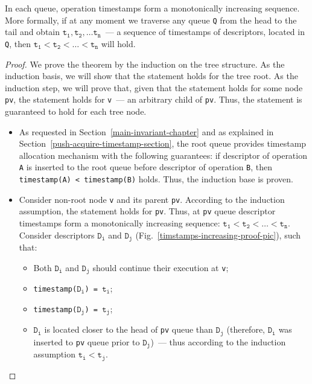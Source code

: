 \documentclass[times, dvipsnames,%
               languages={russian,english} %
              ]{itmo-student-thesis}
\begin{document}
\begin{theorem}
In each queue, operation timestamps form a monotonically increasing sequence. More formally, if at any moment we traverse any queue \texttt{Q} from the head to the tail and obtain $\texttt{t}_{\texttt{1}}, \texttt{t}_{\texttt{2}}, \ldots \texttt{t}_{\texttt{n}}$~--- a sequence of timestamps of descriptors, located in \texttt{Q}, then $\texttt{t}_{\texttt{1}} < \texttt{t}_{\texttt{2}} < \ldots < \texttt{t}_{\texttt{n}}$ will hold.
\end{theorem}

\begin{proof}
We prove the theorem by the induction on the tree structure. As the induction basis, we will show that the statement holds for the tree root. As the induction step, we will prove that, given that the statement holds for some node \texttt{pv}, the statement holds for \texttt{v}~--- an arbitrary child of \texttt{pv}. Thus, the statement is guaranteed to hold for each tree node.

\begin{itemize}
    \item As requested in Section~\ref{main-invariant-chapter} and as explained in Section~\ref{push-acquire-timestamp-section}, the root queue provides timestamp allocation mechanism with the following guarantees: if descriptor of operation \texttt{A} is inserted to the root queue before descriptor of operation \texttt{B}, then \texttt{timestamp(A) < timestamp(B)} holds. Thus, the induction base is proven.
    
    \item Consider non-root node \texttt{v} and its parent \texttt{pv}. According to the induction assumption, the statement holds for \texttt{pv}. Thus, at \texttt{pv} queue descriptor timestamps form a monotonically increasing sequence: $\texttt{t}_{\texttt{1}} < \texttt{t}_{\texttt{2}} < \ldots < \texttt{t}_{\texttt{n}}$. Consider descriptors $\texttt{D}_{\texttt{i}}$ and $\texttt{D}_{\texttt{j}}$ (Fig.~\ref{timstamps-increasing-proof-pic}), such that:
    
    \begin{itemize}
        \item Both $\texttt{D}_{\texttt{i}}$ and $\texttt{D}_{\texttt{j}}$ should continue their execution at \texttt{v};
        \item \texttt{timestamp($\texttt{D}_{\texttt{i}}$) = $\texttt{t}_{\texttt{i}}$};
        \item \texttt{timestamp($\texttt{D}_{\texttt{j}}$) = $\texttt{t}_{\texttt{j}}$};
        \item $\texttt{D}_{\texttt{i}}$ is located closer to the head of \texttt{pv} queue than $ \texttt{D}_{ \texttt{j}}$ (therefore, $\texttt{D}_{\texttt{i}}$ was inserted to \texttt{pv} queue prior to $\texttt{D}_{\texttt{j}}$)~--- thus according to the induction assumption $\texttt{t}_{\texttt{i}} < \texttt{t}_{\texttt{j}}$.
    \end{itemize}
    

\end{itemize}
\end{proof}
\end{document}
